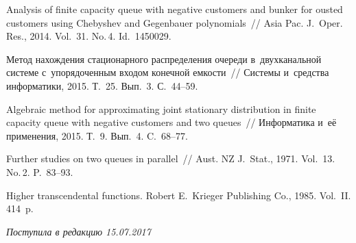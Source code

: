 \begin{multicols}{2}
{{\begin{thebibliography}{99}
 Analysis of finite capacity queue with negative customers 
and bunker for ousted customers using Chebyshev and Gegenbauer polynomials~// 
{Asia Pac. J.~Oper. Res.}, 2014. Vol.~31. No.\,4. Id.~1450029.

Метод нахождения стационарного распределения очереди в~двухканальной системе 
с~упорядоченным входом конечной емкости~// 
Системы и~средства информатики, 2015. Т.~25. Вып.~3. С.~44--59.

 Algebraic method for approximating joint stationary 
distribution in finite capacity queue with negative customers and two queues~//
Информатика и~её применения, 2015.  Т.~9. Вып.~4. C.~68--77.

Further studies on two queues in parallel~// 
{Aust. NZ J.~Stat.}, 1971. Vol.~13. No.\,2. P.~83--93.


 {Higher transcendental functions.} 
Robert E.~Krieger Publishing Co., 1985.  Vol.~II. 414~p.




\end{thebibliography}
} }

\end{multicols}

 \label{end\stat}

 \vspace*{-3pt}

\hfill{\small\textit{Поступила в редакцию  15.07.2017}}


\renewcommand{\figurename}{\protect\bf Рис.}
\renewcommand{\tablename}{\protect\bf Таблица}